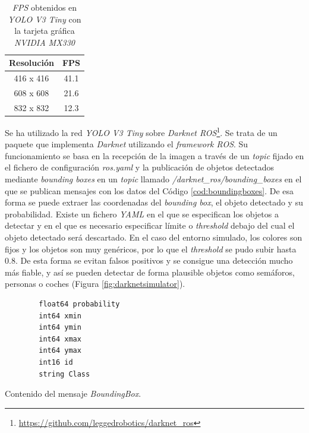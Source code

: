 \begin{table}[H]
	\begin{center}
		\begin{tabular}{|c|c|}
			\hline
			\textbf{Resolución} & \textbf{FPS}
			\\
			\hline
			416 x 416           & 41.1
			\\
			608 x 608           & 21.6
			\\
			832 x 832           & 12.3
			\\
			\hline
		\end{tabular}
		\caption{\textit{FPS} obtenidos en \textit{YOLO V3 Tiny} con la tarjeta gráfica \textit{NVIDIA MX330}}
		\label{table:versusnotebook}
	\end{center}
\end{table}

Se ha utilizado la red \textit{YOLO V3 Tiny} sobre \textit{Darknet ROS}\footnote{\url{https://github.com/leggedrobotics/darknet_ros}}. Se trata de un paquete que implementa \textit{Darknet} utilizando el \textit{framework ROS}. Su funcionamiento se basa en la recepción de la imagen a través de un \textit{topic} fijado en el fichero de configuración \textit{ros.yaml} y la publicación de objetos detectados mediante \textit{bounding boxes} en un \textit{topic} llamado \textit{/darknet\_ros/bounding\_boxes} en el que se publican mensajes con los datos del Código \ref{cod:boundingboxes}. De esa forma se puede extraer las coordenadas del \textit{bounding box}, el objeto detectado y su probabilidad. Existe un fichero \textit{YAML} en el que se especifican los objetos a detectar y en el que es necesario especificar límite o \textit{threshold} debajo del cual el objeto detectado será descartado. En el caso del entorno simulado, los colores son fijos y los objetos son muy genéricos, por lo que el \textit{threshold} se pudo subir hasta 0.8. De esta forma se evitan falsos positivos y se consigue una detección mucho más fiable, y así se pueden detectar de forma plausible objetos como semáforos, personas o coches (Figura \ref{fig:darknetsimulator}).\\

\begin{code}[h]
	\begin{lstlisting}
		float64 probability
		int64 xmin
		int64 ymin
		int64 xmax
		int64 ymax
		int16 id
		string Class
	\end{lstlisting}
	\caption[Contenido del mensaje \textit{BoundingBox}.]{Contenido del mensaje \textit{BoundingBox}.}
	\label{cod:boundingboxes}
\end{code}

